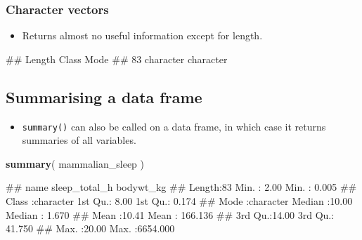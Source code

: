 \documentclass[
]{book}
\newenvironment{Shaded}{\begin{snugshade}}{\end{snugshade}}
\newcommand{\FunctionTok}[1]{\textcolor[rgb]{0.13,0.29,0.53}{\textbf{#1}}}
\newcommand{\NormalTok}[1]{#1}
\newcommand{\SpecialCharTok}[1]{\textcolor[rgb]{0.81,0.36,0.00}{\textbf{#1}}}
\providecommand{\tightlist}{%
  \setlength{\itemsep}{0pt}\setlength{\parskip}{0pt}}
\begin{document}
\subsubsection{Character vectors}\label{character-vectors}

\begin{itemize}
\tightlist
\item
  Returns almost no useful information except for length.
\end{itemize}

\begin{Shaded}
\end{Shaded}

\begin{Shaded}
\begin{Highlighting}[]
\NormalTok{\#\#    Length     Class      Mode }
\NormalTok{\#\#        83 character character}
\end{Highlighting}
\end{Shaded}

\subsection{Summarising a data frame}\label{summarising-a-data-frame}

\begin{itemize}
\tightlist
\item
  \texttt{summary()} can also be called on a data frame, in which case it returns summaries of all variables.
\end{itemize}

\begin{Shaded}
\begin{Highlighting}[]
\FunctionTok{summary}\NormalTok{( mammalian\_sleep )}
\end{Highlighting}
\end{Shaded}

\begin{Shaded}
\begin{Highlighting}[]
\NormalTok{\#\#      name           sleep\_total\_h     bodywt\_kg       }
\NormalTok{\#\#  Length:83          Min.   : 2.00   Min.   :   0.005  }
\NormalTok{\#\#  Class :character   1st Qu.: 8.00   1st Qu.:   0.174  }
\NormalTok{\#\#  Mode  :character   Median :10.00   Median :   1.670  }
\NormalTok{\#\#                     Mean   :10.41   Mean   : 166.136  }
\NormalTok{\#\#                     3rd Qu.:14.00   3rd Qu.:  41.750  }
\NormalTok{\#\#                     Max.   :20.00   Max.   :6654.000}
\end{Highlighting}
\end{Shaded}
\end{document}
